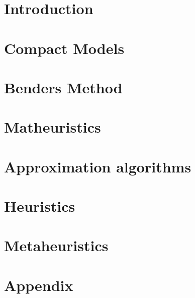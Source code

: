 \documentclass{lincolncsthesis}
\begin{document}

\maketitle

\thesisTables
\thesisBodyStart



\chapter{Introduction}


\chapter{Compact Models}


\chapter{Benders Method}


\chapter{Matheuristics}
\label{chap:Matheuristics}


\chapter{Approximation algorithms}


\chapter{Heuristics}
\label{chap:Heuristics}


\chapter{Metaheuristics}
\label{chap:metaheuristics}


% 

\appendix
\chapter{Appendix}


\printReferences
\end{document}
